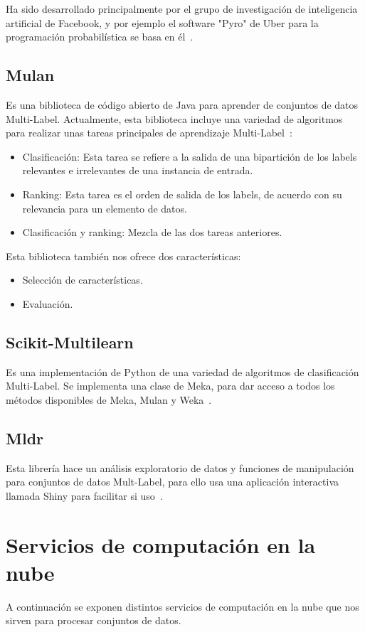 Ha sido desarrollado principalmente por el grupo de investigación de inteligencia artificial de Facebook, y por ejemplo el software "Pyro" de Uber para la programación probabilística se basa en él~\cite{wiki:pytorch}.

\subsection{Mulan}
Es una biblioteca de código abierto de Java para aprender de conjuntos de datos Multi-Label. Actualmente, esta biblioteca incluye una variedad de algoritmos para realizar unas tareas principales de aprendizaje Multi-Label~\cite{mulan}:
\begin{itemize}
	\item Clasificación: Esta tarea se refiere a la salida de una bipartición de los labels relevantes e irrelevantes de una instancia de entrada.
	\item Ranking: Esta tarea es el orden de salida de los labels, de acuerdo con su relevancia para un elemento de datos.
	\item Clasificación y ranking: Mezcla de las dos tareas anteriores.
\end{itemize}
Esta biblioteca también nos ofrece dos características:
\begin{itemize}
	\item Selección de características.
	\item Evaluación.
\end{itemize}

\subsection{Scikit-Multilearn}
Es una implementación de Python de una variedad de algoritmos de clasificación Multi-Label.
Se implementa una clase de Meka, para dar acceso a todos los métodos disponibles de Meka, Mulan y Weka~\cite{scikit-multilearn}.

\subsection{Mldr}
Esta librería hace un análisis exploratorio de datos y funciones de manipulación para conjuntos de datos Mult-Label, para ello usa una aplicación interactiva llamada Shiny para facilitar si uso~\cite{mldr}.

\section{Servicios de computación en la nube}
A continuación se exponen distintos servicios de computación en la nube que nos sirven para procesar conjuntos de datos.

